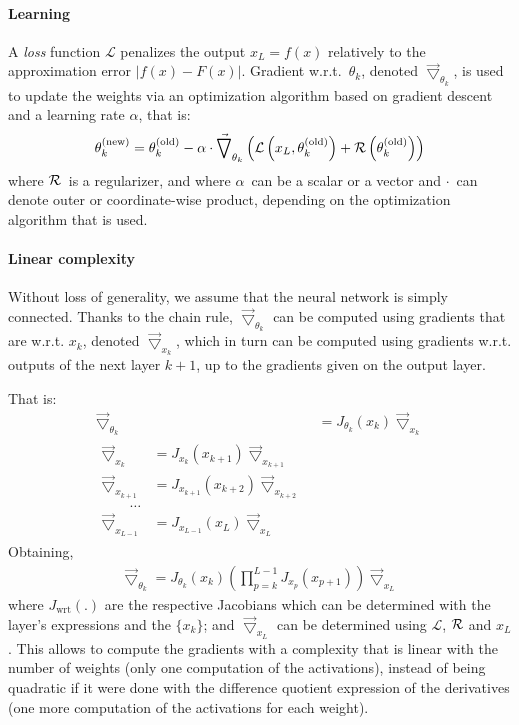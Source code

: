 \paragraph{Learning}
A \emph{loss} function $\mathcal{L}$ penalizes the output $x_L = f(x)$ relatively to the approximation error $|f(x) - F(x)|$. Gradient w.r.t.~$\theta_k$, denoted $\vec{\bigtriangledown}_{\theta_k}$, is used to update the weights via an optimization algorithm based on gradient descent and a learning rate $\alpha$, that is:
\begin{gather}
\theta_k^{(\text{new})} = \theta_k^{(\text{old})} - \alpha \cdot \vec{\bigtriangledown}_{\theta_k} \left( \mathcal{L}\left( x_L, \theta_k^{(\text{old})} \right) + \mathcal{R}\left( \theta_k^{(\text{old})} \right) \right)
\end{gather}
where $\mathcal{R}$~is a regularizer, and where $\alpha$~can be a scalar or a vector and $\cdot$~can denote outer or coordinate-wise product, depending on the optimization algorithm that is used.

\paragraph{Linear complexity}
Without loss of generality, we assume that the neural network is simply connected. Thanks to the chain rule, $\vec{\bigtriangledown}_{\theta_k}$ can be computed using gradients that are w.r.t. $x_k$, denoted $\vec{\bigtriangledown}_{x_k}$, which in turn can be computed using gradients w.r.t. outputs of the next layer $k+1$, up to the gradients given on the output layer.

That is:
\begin{align}
  \vec{\bigtriangledown}_{\theta_k} & = J_{\theta_k}(x_k) \vec{\bigtriangledown}_{x_k} \\
  \begin{split}
  \vec{\bigtriangledown}_{x_k} & = J_{x_k}(x_{k+1}) \vec{\bigtriangledown}_{x_{k+1}} \\
  \vec{\bigtriangledown}_{x_{k+1}} & = J_{x_{k+1}}(x_{k+2}) \vec{\bigtriangledown}_{x_{k+2}} \\
  \quad \quad \ldots\\
  \vec{\bigtriangledown}_{x_{L-1}} & = J_{x_{L-1}}(x_{L}) \vec{\bigtriangledown}_{x_{L}}
  \label{eq:bp}
  \end{split}
\end{align}
Obtaining,
\begin{align}
  \vec{\bigtriangledown}_{\theta_k} = J_{\theta_k}(x_k) (\prod_{p=k}^{L-1} J_{x_p}(x_{p+1})) \vec{\bigtriangledown}_{x_L}
\end{align}
where $J_{\text{wrt}}(.)$ are the respective Jacobians which can be determined with the layer's expressions and the $\{x_k\}$; and $\vec{\bigtriangledown}_{x_L}$ can be determined using $\mathcal{L}$, $\mathcal{R}$ and $x_L$.
This allows to compute the gradients with a complexity that is linear with the number of weights (only one computation of the activations), instead of being quadratic if it were done with the difference quotient expression of the derivatives (one more computation of the activations for each weight).

